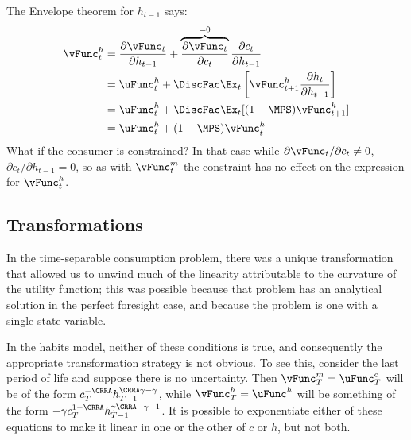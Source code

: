 \documentclass[titlepage, headings=optiontotocandhead]{\econtex}
\begin{document}
{  The Envelope theorem for $h_{t-1}$ says:
  \begin{equation}\begin{gathered}\begin{aligned}
        {\vFunc}_{t}^{h}  & = \frac{\partial {\vFunc}_{t}}{\partial h_{t-1}} + \overbrace{\frac{\partial {\vFunc}_{t}}{\partial {c}_{t}}}^{=0}\frac{\partial {c}_{t}}{\partial h_{t-1}} \nonumber
        \\  & = \uFunc^{h}_{t} + \DiscFac \Ex_{t} \left[{\vFunc}_{t+1}^{h}\frac{\partial h_{t}}{\partial h_{t-1}} \right]\nonumber
        \\  & = \uFunc^{h}_{t} + \DiscFac \Ex_{t} [(1-\MPS) {\vFunc}_{t+1}^{h}] \nonumber
        \\  & = \uFunc^{h}_{t} + (1-\MPS) \vEOPt^{h} \label{eq:vhtformula}
      \end{aligned}\end{gathered}\end{equation}
  What if the consumer is constrained?  In that case while $\partial
  {\vFunc}_{t}/\partial {c}_{t} \neq 0$, $\partial {c}_{t}/\partial h_{t-1} = 0$, so as
  with ${\vFunc}_{t}^{m}$ the constraint has no effect on the expression for ${\vFunc}^{h}_{t}$.

  \hypertarget{Transforamtions}{}
  \subsection{Transformations}

  In the time-separable consumption problem, there was a unique
  transformation that allowed us to unwind much of the linearity
  attributable to the curvature of the utility function; this was
  possible because that problem has an analytical solution in the
  perfect foresight case, and because the problem is one with a single
  state variable.

  In the habits model, neither of these conditions is true, and
  consequently the appropriate transformation strategy is not obvious.
  To see this, consider the last period of life and suppose there is no
  uncertainty.  Then ${\vFunc}_{T}^{m} = \uFunc_{T}^{c}$ will be of the form
  ${c}_{T}^{-\CRRA}h_{T-1}^{\CRRA \gamma - \gamma}$, while ${\vFunc}_{T}^{h} =
  \uFunc^{h}$ will be something of the form $-\gamma
  {c}_{T}^{1-\CRRA}h_{T-1}^{\gamma\CRRA-\gamma-1}$.  It is possible to
  exponentiate either of these equations to make it linear in one or the
  other of ${c}$ or $h$, but not both.

}
\end{document}
